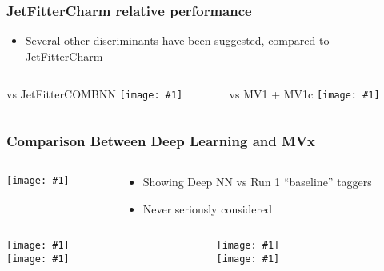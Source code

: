 \documentclass[usenames,dvipsnames]{beamer}
\newcommand{\widegraphic}[1]{\texttt{[image: \#1]}}
\begin{document}
\begin{frame}
  \frametitle{JetFitterCharm relative performance}
  \begin{itemize}
  \item Several other discriminants have been suggested, compared to JetFitterCharm
  \end{itemize}
  \begin{columns}
    \begin{column}{0.5\textwidth}
      \begin{center}
        vs JetFitterCOMBNN
      \widegraphic{figures/external/ctag-2d-jfc-vs-jfit.pdf}
      \end{center}
    \end{column}
    \begin{column}{0.5\textwidth}
      \begin{center}
        vs MV1 + MV1c
      \widegraphic{figures/external/ctag-2d-jfc-vs-mv.pdf}
      \end{center}
    \end{column}
  \end{columns}
\end{frame}


\begin{frame}
  \frametitle{Comparison Between Deep Learning and MVx}
  \begin{columns}
    \begin{column}{0.5\textwidth}
      \widegraphic{figures/external/ctag-2d-gaia-vs-mv.pdf}
    \end{column}
    \begin{column}{0.5\textwidth}
      \begin{itemize}
      \item Showing Deep NN vs Run 1 ``baseline'' taggers
      \item Never seriously considered
      \end{itemize}
    \end{column}
  \end{columns}
\end{frame}

\begin{frame}
  \begin{columns}
    \begin{column}{0.45\textwidth}
      \widegraphic{int/figures/stackplots/dans/signal_mct150/met.pdf} \\
      \widegraphic{int/figures/stackplots/dans/signal_mct150/j0_pt.pdf}
    \end{column}
    \begin{column}{0.45\textwidth}
      \widegraphic{int/figures/stackplots/dans/signal_mct150/j1_pt.pdf} \\
      \widegraphic{int/figures/stackplots/dans/signal_mct150/j2_pt.pdf}
    \end{column}
  \end{columns}
\end{frame}
\end{document}
